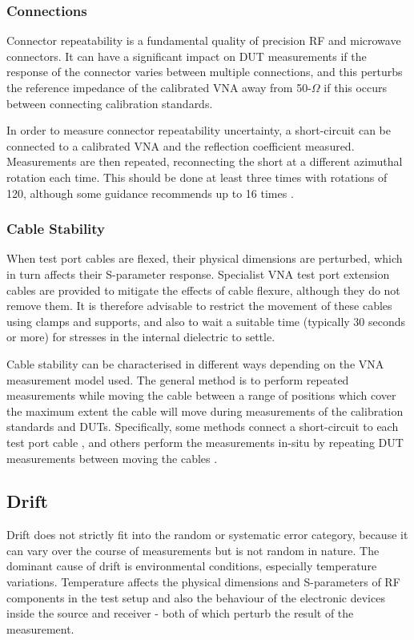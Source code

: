 \documentclass[../thesis/thesis.tex]{subfiles}
\begin{document}
\subsubsection{Connections}

Connector repeatability is a fundamental quality of precision RF and microwave connectors. It can have a significant impact on DUT measurements if the response of the connector varies between multiple connections, and this perturbs the reference impedance of the calibrated VNA away from 50-$\Omega$ if this occurs between connecting calibration standards.

In order to measure connector repeatability uncertainty, a short-circuit can be connected to a calibrated VNA and the reflection coefficient measured. Measurements are then repeated, reconnecting the short at a different azimuthal rotation each time. This should be done at least three times with rotations of 120\textdegree, although some guidance recommends up to 16 times \cite{EURAMET_2011}.

\subsubsection{Cable Stability}

When test port cables are flexed, their physical dimensions are perturbed, which in turn affects their S-parameter response. Specialist VNA test port extension cables are provided to mitigate the effects of cable flexure, although they do not remove them. It is therefore advisable to restrict the movement of these cables using clamps and supports, and also to wait a suitable time (typically 30 seconds or more) for stresses in the internal dielectric to settle.

Cable stability can be characterised in different ways depending on the VNA measurement model used. The general method is to perform repeated measurements while moving the cable between a range of positions which cover the maximum extent the cable will move during measurements of the calibration standards and DUTs. Specifically, some methods connect a short-circuit to each test port cable \cite{EURAMET_2011}, and others perform the measurements in-situ by repeating DUT measurements between moving the cables \cite{MUFWebsite}.

\subsection{Drift}

Drift does not strictly fit into the random or systematic error category, because it can vary over the course of measurements but is not random in nature. The dominant cause of drift is environmental conditions, especially temperature variations. Temperature affects the physical dimensions and S-parameters of RF components in the test setup and also the behaviour of the electronic devices inside the source and receiver - both of which perturb the result of the measurement.
\end{document}
